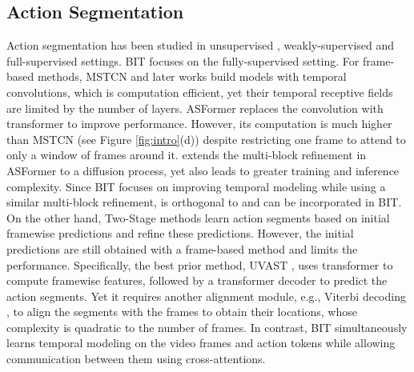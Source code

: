 \documentclass[10pt,twocolumn,letterpaper]{article}
\newcommand{\0}{\boldsymbol{0}}
\begin{document}
\subsection{Action Segmentation} 
\vspace{-2mm}
Action segmentation has been studied in unsupervised \cite{Shen:CVPR21, Alayrac:CVPR16,Elhamifar:ICCV19,Zhukov:CVPR19,Kukleva:CVPR19,Fried:ACL20,Elhamifar:ECCV20}, weakly-supervised \cite{Richard-Viterbi:CVPR18,Ding:CVPR18,Chang:CVPR19,Li:ICCV19,Lu:ICCV21,Souri:PAMI21,Richard:CVPR18,Li:CVPR20,Li:CVPR21-weaksup,Fayyaz:CVPR20, Shen:CVPR22, Lu:CVPR22,Lu:ICCV21, Li:CVPR21-timesup,Rahaman:ECCV22} and full-supervised \cite{Farha:CVPR19,Li:TPAMI20,Yi:BMVC21,Dipika:Arxiv21,Behrmann:ECCV22,Ahn:ICCV21, Souri:PAMI21, Rohrbach:CVPR12, Singh:CVPR16, Kuehne:WACV16, Lea:CVPR17, Sigurdsson:CVPR17, Yeung:CVPR18,Zhang:Arxiv22,Li:CVPR22,Liu:Arxiv23} settings. BIT focuses on the fully-supervised setting. 
For frame-based methods, 
MSTCN \cite{Farha:CVPR19} and later works \cite{Li:TPAMI20,Dipika:Arxiv21} build models with temporal convolutions, which is computation efficient, yet their temporal receptive fields are limited by the number of layers. 
ASFormer \cite{Yi:BMVC21} replaces the convolution with transformer to improve performance. 
However, its computation is much higher than MSTCN (see Figure \ref{fig:intro}(d)) despite restricting one frame to attend to only a window of frames around it. 
\cite{Liu:Arxiv23} extends the multi-block refinement in ASFormer to a diffusion process, yet also leads to greater training and inference complexity. Since BIT focuses on improving temporal modeling while using a similar multi-block refinement, \cite{Liu:Arxiv23} is orthogonal to and can be incorporated in BIT.
On the other hand, Two-Stage methods \cite{Huang:CVPR20, Ahn:ICCV21, Behrmann:ECCV22} learn action segments based on initial framewise predictions and refine these predictions. However, the initial predictions are still obtained with a frame-based method and limits the performance.
Specifically, the best prior method, UVAST \cite{Behrmann:ECCV22}, uses transformer to compute framewise features, followed by a transformer decoder to predict the action segments. Yet it requires another alignment module, e.g., Viterbi decoding \cite{Forney:IEEE73,Richard-Viterbi:CVPR18}, to align the segments with the frames to obtain their locations, whose complexity is quadratic to the number of frames.
In contrast, BIT simultaneously learns temporal modeling on the video frames and action tokens while allowing communication between them using cross-attentions. 
\end{document}
